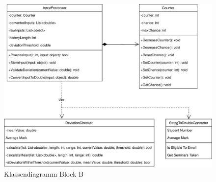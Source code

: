 \documentclass{article}
\begin{document}
    \begin{figure}[H] 
        \includegraphics[width=\linewidth]{./image/klassendiagramm-blockb.pdf}
        \caption{Klassendiagramm Block B}
        \label{Klassendiagramm Block B}
    \end{figure}
    \noindent
\end{document}
